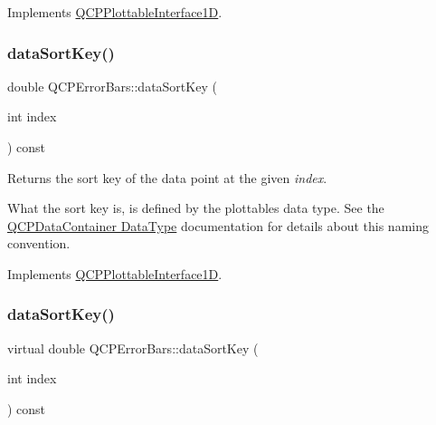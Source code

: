 Implements \hyperlink{class_q_c_p_plottable_interface1_d_a78911838cfbcfd2d8df9ad2fdbfb8e93}{Q\+C\+P\+Plottable\+Interface1D}.

\mbox{\label{class_q_c_p_error_bars_a1ef91328ad7dde84695958139d5f40cf}} 
\subsubsection{\texorpdfstring{data\+Sort\+Key()}{dataSortKey()}\hspace{0.1cm}{\footnotesize\ttfamily [1/2]}}
{\footnotesize\ttfamily double Q\+C\+P\+Error\+Bars\+::data\+Sort\+Key (\begin{DoxyParamCaption}\item[{int}]{index }\end{DoxyParamCaption}) const\hspace{0.3cm}{\ttfamily [virtual]}}

Returns the sort key of the data point at the given {\itshape index}.

What the sort key is, is defined by the plottable\textquotesingle{}s data type. See the \hyperlink{class_q_c_p_data_container_qcpdatacontainer-datatype}{Q\+C\+P\+Data\+Container Data\+Type} documentation for details about this naming convention. 

Implements \hyperlink{class_q_c_p_plottable_interface1_d_afdc92f9f01e7e35f2e96b2ea9dc14ae7}{Q\+C\+P\+Plottable\+Interface1D}.

\mbox{\label{class_q_c_p_error_bars_a31ba7d98d805617c41c7773ae2d2886b}} 
\subsubsection{\texorpdfstring{data\+Sort\+Key()}{dataSortKey()}\hspace{0.1cm}{\footnotesize\ttfamily [2/2]}}
{\footnotesize\ttfamily virtual double Q\+C\+P\+Error\+Bars\+::data\+Sort\+Key (\begin{DoxyParamCaption}\item[{int}]{index }\end{DoxyParamCaption}) const\hspace{0.3cm}{\ttfamily [virtual]}}

